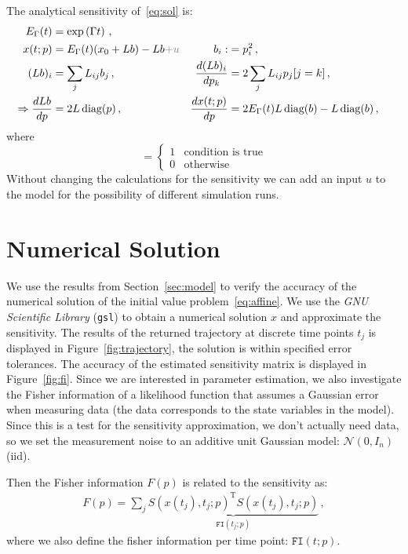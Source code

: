 \documentclass[utf8,english,DIV=12]{scrartcl}
\newcommand{\diag}{\text{diag}}
\begin{document}
The analytical sensitivity of~\eqref{eq:sol} is:
\begin{align}
  E_\Gamma(t) &=\exp\left(\Gamma t\right)\,,\\
  x(t;p) &= E_\Gamma(t) (x_0 + Lb) - Lb {\color{gray}+ u}& b_i:&= p_i^2\,,\\
  (Lb)_i &=\sum_j L_{ij} b_j\,,& \frac{d(Lb)_i}{dp_k}&= 2\sum_j L_{ij}p_j [j=k]\,,\\
  \Rightarrow \frac{dLb}{dp} &= 2 L\,\diag(p)\,,&
  \frac{dx(t;p)}{dp} &=2 E_\Gamma(t) L\,\diag(b) - L\,\diag(b)\,,
\end{align}
where
\begin{equation}
  [\text{condition}] = \left\{
    \begin{array}{cl}
      1&\text{condition is true}\\
      0&\text{otherwise}
    \end{array}\right.
  \label{eq:logical}
\end{equation}
Without changing the calculations for the sensitivity we can add an input $u$ to the
model for the possibility of different simulation runs.

\section{Numerical Solution}
\label{sec:gsl}

We use the results from Section~\ref{sec:model} to verify the accuracy
of the numerical solution of the initial value
problem~\eqref{eq:affine}. We use the \emph{GNU Scientific Library} (\texttt{gsl}) to
obtain a numerical solution $x$ and approximate the sensitivity. The
results of the returned trajectory at discrete time points $t_j$ is
displayed in Figure~\ref{fig:trajectory}, the solution is within
specified error tolerances. The accuracy of the estimated sensitivity
matrix is displayed in Figure~\ref{fig:fi}. Since we are
interested in parameter estimation, we also investigate the Fisher
information of a likelihood function that assumes a Gaussian error
when measuring data (the data corresponds to the state variables in
the model). Since this is a test for the sensitivity approximation, we
don't actually need data, so we set the measurement noise to an additive unit
Gaussian model: $\mathcal{N}(0,I_n)$ (iid).

Then the Fisher information $F(p)$ is related to the sensitivity as:
\begin{align}
  F(p) = \sum_j \underbrace{S(x(t_j),t_j;p)^{\text{T}} S(x(t_j),t_j;p)}_{\texttt{FI}(t_j;p)}\,,
\end{align}
where we also define the fisher information per time point: $\texttt{FI}(t;p)$.
\end{document}
